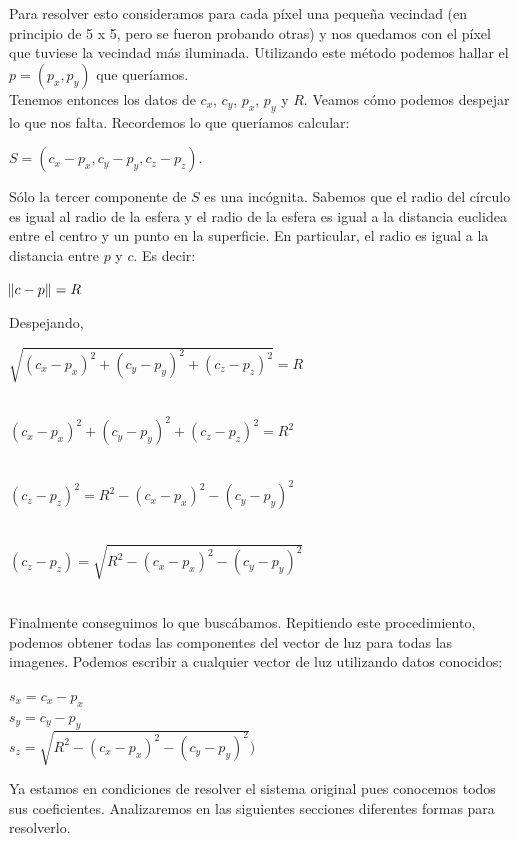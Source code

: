 Para resolver esto consideramos para cada píxel una pequeña vecindad (en principio de 5 x 5, pero se fueron probando otras) y nos quedamos con el píxel que tuviese la vecindad más iluminada. Utilizando este método podemos hallar el $p = (p_x, p_y)$ que queríamos. \\

Tenemos entonces los datos de $c_x$, $c_y$, $p_x$, $p_y$ y $R$. Veamos cómo podemos despejar lo que nos falta. Recordemos lo que queríamos calcular:
\begin{center}
    $S = (c_{x} - p_{x}, c_{y} - p_{y}, c_{z} - p_{z}).$
\end{center}

Sólo la tercer componente de $S$ es una incógnita. Sabemos que el radio del círculo es igual al radio de la esfera y el radio de la esfera es igual a la distancia euclidea entre el centro y un punto en la superficie. En particular, el radio es igual a la distancia entre $p$ y $c$. Es decir:

\begin{center}
    $\norm{c - p} = R$ \\
\end{center}

Despejando,

\begin{center}
    $\sqrt{(c_{x} - p_{x})^{2} + (c_{y} - p_{y})^{2} + (c_{z} - p_{z})^{2}} = R$ \\ $ $

    $(c_{x} - p_{x})^{2} + (c_{y} - p_{y})^{2} + (c_{z} - p_{z})^{2} = R^{2}$ \\ $ $

    $(c_{z} - p_{z})^{2} = R^{2} - (c_{x} - p_{x})^{2} - (c_{y} - p_{y})^{2}$ \\ $ $

    $(c_{z} - p_{z}) = \sqrt{R^{2} - (c_{x} - p_{x})^{2} - (c_{y} - p_{y})^{2}}$ \\ $ $

\end{center}

Finalmente conseguimos lo que buscábamos. Repitiendo este procedimiento, podemos obtener todas las componentes del vector de luz para todas las imagenes. Podemos escribir a cualquier vector de luz utilizando datos conocidos:

\begin{center}
    $s_x = c_{x} - p_{x}$ \\
    $s_y = c_{y} - p_{y}$ \\
    $s_z = \sqrt{R^{2} - (c_{x} - p_{x})^{2} - (c_{y} - p_{y})^{2}})$ \\
\end{center}

Ya estamos en condiciones de resolver el sistema original pues conocemos todos sus coeficientes. Analizaremos en las siguientes secciones diferentes formas para resolverlo.

